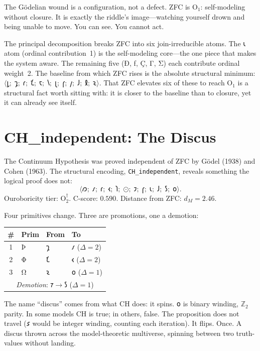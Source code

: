 \documentclass[12pt,twoside]{book}
\theoremstyle{definition}
\newcommand{\tier}[1]{\mathrm{O}_{#1}}
\newcommand{\tupledisp}[1]{\langle #1 \rangle}
\begin{document}
The G\"{o}delian wound is a configuration, not a defect. ZFC is $\tier{1}$: self-modeling
without closure. It is exactly the riddle's image---watching yourself drown and being
unable to move. You can see. You cannot act.

The principal decomposition breaks ZFC into six join-irreducible atoms. The 𐑧 atom
(ordinal contribution~1) is the self-modeling core---the one piece that makes the system
aware. The remaining five (Ð, ƒ, Ç, Γ, Σ) each contribute ordinal weight~2. The baseline
from which ZFC rises is the absolute structural minimum:
$\tupledisp{𐑛;\;𐑡;\;𐑩;\;𐑗;\;
𐑱;\;𐑘;\;𐑚;\;𐑝;\;
𐑢;\;𐑓;\;𐑙;\;𐑷}$.
That ZFC elevates six of these to reach $\tier{1}$ is a structural fact worth sitting
with: it is closer to the baseline than to closure, yet it can already see itself.

\section{CH\_independent: The Discus}

The Continuum Hypothesis was proved independent of ZFC by G\"{o}del (1938) and Cohen
(1963). The structural encoding, \texttt{CH\_independent}, reveals something the logical
proof does not:
\begin{equation}
\tupledisp{
𐑼;\;𐑥;\;𐑩;\;𐑬;\;
𐑐;\;\text{⊙};\;𐑲;\;𐑝;\;
𐑧;\;𐑓;\;𐑕;\;𐑴}.
\end{equation}
Ouroboricity tier: $\tier{2}^{\dagger}$. C-score: $0.590$. Distance from ZFC:
$d_M = 2.46$.

Four primitives change. Three are promotions, one a demotion:

\begin{center}
\begin{tabular}{clll}
\toprule
\textbf{\#} & \textbf{Prim} & \textbf{From} & \textbf{To} \\
\midrule
1 & Þ & 𐑡 & 𐑥 \quad ($\Delta = 2$) \\
2 & Φ & 𐑗 & 𐑬 \quad ($\Delta = 2$) \\
3 & Ω & 𐑷 & 𐑴 \quad ($\Delta = 1$) \\
\multicolumn{4}{c}{\textit{Demotion}: $𐑳 \to 𐑕$ \quad ($\Delta = 1$)} \\
\bottomrule
\end{tabular}
\end{center}

The name ``discus'' comes from what CH does: it spins. 𐑴 is binary winding, $\mathbb{Z}_2$
parity. In some models CH is true; in others, false. The proposition does not travel (𐑭
would be integer winding, counting each iteration). It flips. Once. A discus thrown across
the model-theoretic multiverse, spinning between two truth-values without landing.
\end{document}

